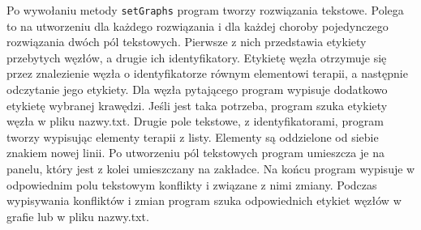Po wywołaniu metody \texttt{setGraphs} program tworzy rozwiązania tekstowe. Polega to na utworzeniu dla każdego rozwiązania i dla każdej choroby pojedynczego rozwiązania dwóch pól tekstowych. Pierwsze z nich przedstawia etykiety przebytych węzłów, a drugie ich identyfikatory. Etykietę węzła otrzymuje się przez znalezienie węzła o identyfikatorze równym elementowi terapii, a następnie odczytanie jego etykiety. Dla węzła pytającego program wypisuje dodatkowo etykietę wybranej krawędzi. Jeśli jest taka potrzeba, program szuka etykiety węzła w pliku nazwy.txt. Drugie pole tekstowe, z identyfikatorami, program tworzy wypisując elementy terapii z listy. Elementy są oddzielone od siebie znakiem nowej linii. Po utworzeniu pól tekstowych program umieszcza je na panelu, który jest z kolei umieszczany na zakładce. Na końcu program wypisuje w odpowiednim polu tekstowym konflikty i związane z nimi zmiany. Podczas wypisywania konfliktów i zmian program szuka odpowiednich etykiet węzłów w grafie lub w pliku nazwy.txt. 

